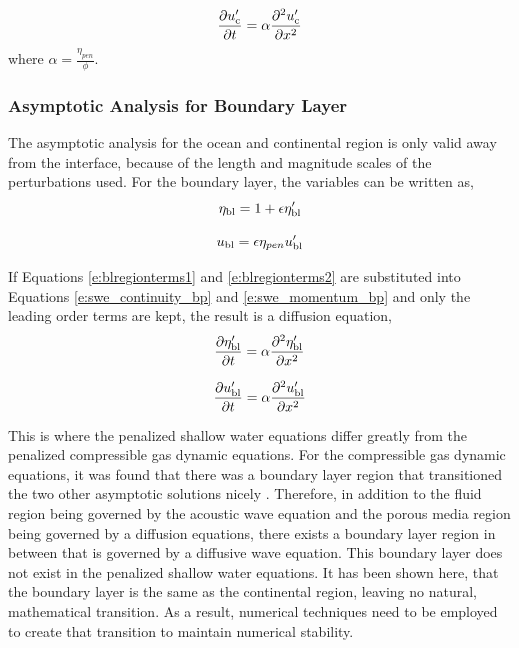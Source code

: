 \begin{equation} \label{e:diffeqn_u}
\frac{\partial u_{\rm c}^{\prime}}{\partial t} =\alpha \frac{\partial ^2 u_{\rm c}^{\prime}}{\partial x^2}
\end{equation}
%
where $\alpha=\frac{\eta_{pen}}{\phi}$.  

\subsubsection{Asymptotic Analysis for Boundary Layer}

The asymptotic analysis for the ocean and continental region is only valid away from the interface, because of the length and magnitude scales of the perturbations used.  For the boundary layer, the variables can be written as, 
%
\begin{equation} \label{e:blregionterms1}
\eta_{\rm bl} = 1 + \epsilon \eta_{\rm bl}^{\prime}
\end{equation}

\begin{equation} \label{e:blregionterms2}
u_{\rm bl} = \epsilon \eta_{pen} u_{\rm bl}^{\prime}
\end{equation}

If Equations \ref{e:blregionterms1} and \ref{e:blregionterms2} are substituted into Equations \ref{e:swe_continuity_bp} and \ref{e:swe_momentum_bp} and only the leading order terms are kept, the result is a diffusion equation, 
%
\begin{equation} \label{e:diffeqn_eta_bl}
\frac{\partial \eta_{\rm bl}^{\prime}}{\partial t} = \alpha \frac{\partial ^2 \eta_{\rm bl}^{\prime}}{\partial x^2}
\end{equation}

\begin{equation} \label{e:diffeqn_u_bl}
\frac{\partial u_{\rm bl}^{\prime}}{\partial t} =\alpha \frac{\partial ^2 u_{\rm bl}^{\prime}}{\partial x^2}
\end{equation}

This is where the penalized shallow water equations differ greatly from the penalized compressible gas dynamic equations.  For the compressible gas dynamic equations, it was found that there was a boundary layer region that transitioned the two other asymptotic solutions nicely \cite{06LV}.  Therefore, in addition to the fluid region being governed by the acoustic wave equation and the porous media region being governed by a diffusion equations, there exists a boundary layer region in between that is governed by a diffusive wave equation.  This boundary layer does not exist in the penalized shallow water equations.  It has been shown here, that the boundary layer is the same as the continental region, leaving no natural, mathematical transition.  As a result, numerical techniques need to be employed to create that transition to maintain numerical stability.  

